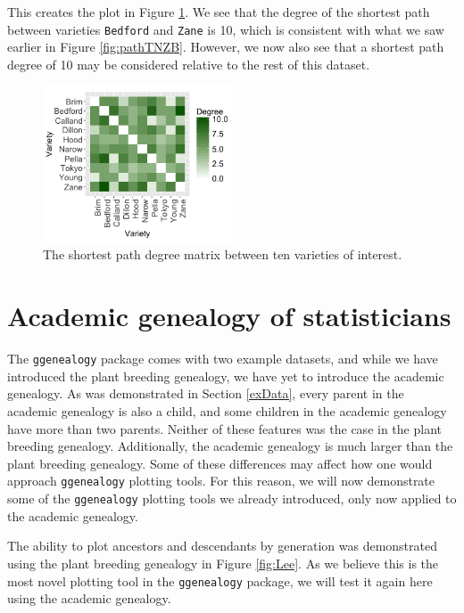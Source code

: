 \documentclass[11pt,a4paper,oldfontcommands,openany]{memoir}
\numberwithin{equation}{section} %
\newcommand{\code}[1]{{\texttt{#1}}}
\newcommand{\pkg}[1]{{\texttt{#1}}}
\begin{document}
This creates the plot in Figure \ref{fig:degMatrix}. We see that the degree of the shortest path between varieties \code{Bedford} and \code{Zane} is 10, which is consistent with what we saw earlier in Figure \ref{fig:pathTNZB}. However, we now also see that a shortest path degree of 10 may be considered relative to the rest of this dataset.

\begin{figure}[h]
    \begin{framed}
    \centering
    \includegraphics[width=0.5\textwidth]{degMatrix}
    \end{framed}
    \caption{The shortest path degree matrix between ten varieties of interest.}
    \label{fig:degMatrix}
\end{figure}

\section{Academic genealogy of statisticians}

The \pkg{ggenealogy} package comes with two example datasets, and while we have introduced the plant breeding genealogy, we have yet to introduce the academic genealogy. As was demonstrated in Section \ref{exData}, every parent in the academic genealogy is also a child, and some children in the academic genealogy have more than two parents. Neither of these features was the case in the plant breeding genealogy. Additionally, the academic genealogy is much larger than the plant breeding genealogy. Some of these differences may affect how one would approach \pkg{ggenealogy} plotting tools. For this reason, we will now demonstrate some of the \pkg{ggenealogy} plotting tools we already introduced, only now applied to the academic genealogy. 

The ability to plot ancestors and descendants by generation was demonstrated using the plant breeding genealogy in Figure \ref{fig:Lee}. As we believe this is the most novel plotting tool in the \pkg{ggenealogy} package, we will test it again here using the academic genealogy.
\end{document}
